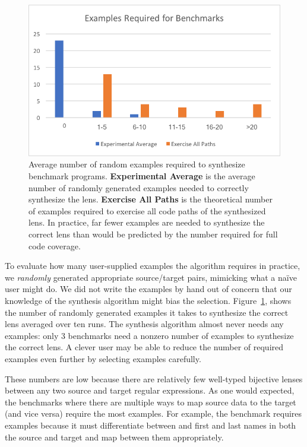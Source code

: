 \documentclass[acmsmall]{acmart}
\begin{document}
\begin{figure}
  \includegraphics{ExsReqd}
  \caption{Average number of random examples required to synthesize benchmark
    programs.  {\bf Experimental Average} is the average number of randomly
    generated examples needed to correctly synthesize the lens.  {\bf Exercise
      All Paths} is the theoretical number of examples required to exercise all
    code paths of the synthesized lens.  In practice, far fewer examples are
    needed to synthesize the correct lens than would be predicted by the number
    required for full code coverage.}
  \label{fig:exs-reqd}
\end{figure}

To evaluate how many user-supplied examples the algorithm requires in
practice, we \textit{randomly} generated appropriate source/target
pairs, mimicking what a na\"{i}ve user might do.  We did not write the
examples by hand out of concern that our knowledge of the synthesis
algorithm might bias the selection. Figure~\ref{fig:exs-reqd}, shows
the number of randomly generated examples it takes to synthesize the
correct lens averaged over ten runs.  The synthesis algorithm almost never needs
any examples: only 3 benchmarks need a nonzero number of examples to synthesize
the correct lens. A clever user may be able to reduce the
number of required examples even further by selecting examples carefully.

These numbers are low because there are relatively few well-typed
bijective lenses between any two source and target regular expressions. 
As one would expected, the benchmarks where there are multiple ways to
map source data to the target (and vice versa) require the most examples.
For example, the benchmark  requires examples because it
must differentiate between and first and last names in both the
source and target and map between them appropriately.
\end{document}
